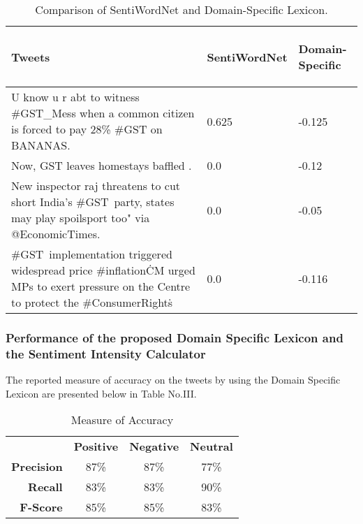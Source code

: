\documentclass[conference]{IEEEtran}
\begin{document}
\begin{table}[h]
	\caption{Comparison of SentiWordNet and Domain-Specific Lexicon.}
	\label{table_example}
	\begin{tabular}{|L{3cm}|C{2cm}|R{1.5cm}|}
		\hline
		\begin{center}
			\textbf{Tweets}
		\end{center}&\begin{center}	\textbf{SentiWordNet}\end{center}&\begin{center}\textbf{Domain-Specific}\end{center} \\
		\hline
		U know u r abt to witness \#GST\_Mess when a common citizen is forced to pay 28\% \#GST on BANANAS. &0.625 & -0.125\\
		\hline
		Now, GST leaves homestays baffled . &0.0 & -0.12\\
		\hline
		New inspector raj threatens to cut short India's \#GST\ party, states may play spoilsport too" via @EconomicTimes. &0.0 &-0.05\\
		\hline
		\#GST\ implementation triggered widespread price \#inflation\. CM urged MPs to exert pressure on the Centre to protect the \#ConsumerRights\.  &0.0 &-0.116\\
		\hline
	\end{tabular}
\end{table}

\subsubsection{Performance of the proposed Domain Specific Lexicon and the Sentiment Intensity Calculator}
The  reported measure of accuracy on the tweets by using the Domain Specific Lexicon are presented below in Table No.III.
\begin{table}[h!]
	\caption{Measure of Accuracy}
	\label{table 2}
	\begin{center}
		\begin{tabular}{ r|c|c|c| }
			\multicolumn{1}{r}{}
			&  \multicolumn{1}{c}{\textbf{Positive}}
			& \multicolumn{1}{c}{\textbf{Negative}} 
			& \multicolumn{1}{c}{\textbf{Neutral}}\\
			\cline{2-4}
			\textbf{Precision} & 87\% & 87\% & 77\% \\
			\cline{2-4}
			\textbf{Recall} & 83\% & 83\%  & 90\% \\
			\cline{2-4}
			\textbf{F-Score} & 85\% & 85\%  & 83\% \\
			\cline{2-4}
		\end{tabular}
	\end{center}
	
	
\end{table}  \\
\end{document}
